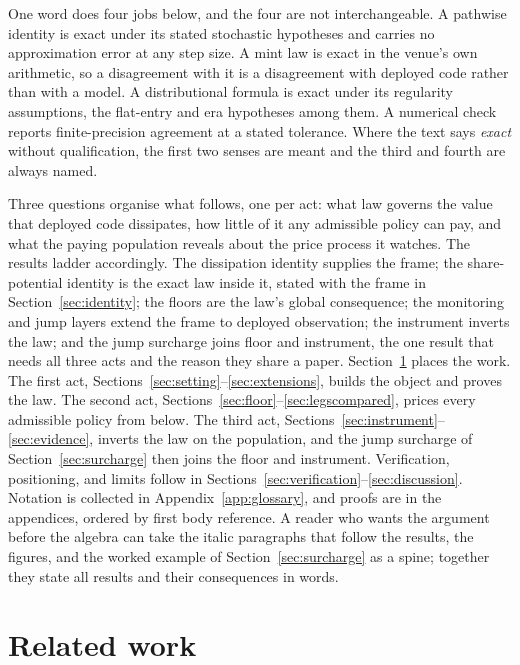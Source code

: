 \documentclass[11pt,a4paper]{article}
\theoremstyle{definition}
\theoremstyle{plain}
\theoremstyle{remark}
\begin{document}
One word does four jobs below, and the four are not interchangeable. A pathwise identity is exact under its stated stochastic hypotheses and carries no approximation error 
at any step size. A mint law is exact in the venue's own arithmetic, so a disagreement with it is a disagreement with deployed code rather than with a model. A distributional 
formula is exact under its regularity assumptions, the flat-entry and era hypotheses among them. A numerical check reports finite-precision agreement at a stated tolerance. 
Where the text says \emph{exact} without qualification, the first two senses are meant and the third and fourth are always named.

Three questions organise what follows, one per act: what law governs the value that deployed code dissipates, how little of it any admissible policy can pay, and what the 
paying population reveals about the price process it watches. The results ladder accordingly. The dissipation identity supplies the frame; the share-potential
identity is the exact law inside it, stated with the frame in Section~\ref{sec:identity}; the floors are the law's global consequence; the monitoring and jump layers extend the 
frame to deployed observation; the instrument inverts the law; and the jump surcharge joins floor and instrument, the one result that needs all three acts and the reason they share a 
paper. Section~\ref{sec:related} places the work. The first act, Sections~\ref{sec:setting}--\ref{sec:extensions}, builds the object and proves the law. The second act,
Sections~\ref{sec:floor}--\ref{sec:legscompared}, prices every admissible policy from below. The third act, Sections~\ref{sec:instrument}--\ref{sec:evidence}, inverts the law
on the population, and the jump surcharge of Section~\ref{sec:surcharge} then joins the floor and instrument. Verification, positioning, and limits follow in
Sections~\ref{sec:verification}--\ref{sec:discussion}. Notation is collected in Appendix~\ref{app:glossary}, and proofs are in the appendices, ordered by first body reference.
A reader who wants the argument before the algebra can take the italic paragraphs that follow the results, the figures, and the
worked example of Section~\ref{sec:surcharge} as a spine; together they state all results and their consequences in words.


\section{Related work}\label{sec:related}
\end{document}
